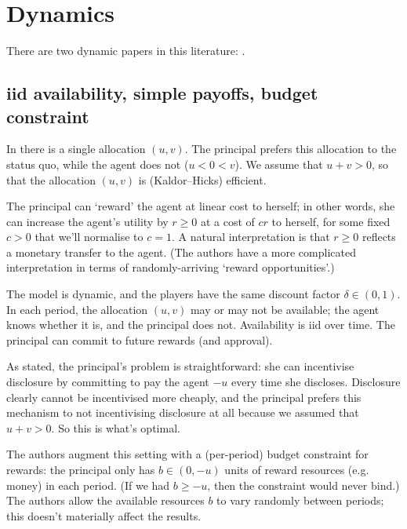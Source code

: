 \section{Dynamics}
\label{sec:ch4:dynamics}

There are two dynamic papers in this literature: \textcite{BirdFrug2019,sfb}.



\subsection{iid availability, simple payoffs, budget constraint}
\label{sec:ch4:dynamics:birdfrug}

In \textcite{BirdFrug2019} there is a single allocation $(u,v)$.
The principal prefers this allocation to the status quo,
while the agent does not ($u<0<v$).
We assume that $u+v>0$, so that the allocation $(u,v)$ is (Kaldor--Hicks) efficient.

The principal can `reward' the agent at linear cost to herself;
in other words, she can increase the agent's utility by $r \geq 0$ at a cost of $c r$ to herself, for some fixed $c>0$ that we'll normalise to $c=1$.
A natural interpretation is that $r \geq 0$ reflects a monetary transfer to the agent. (The authors have a more complicated interpretation in terms of randomly-arriving `reward opportunities'.)

The model is dynamic, and the players have the same discount factor $\delta \in (0,1)$. In each period, the allocation $(u,v)$ may or may not be available; the agent knows whether it is, and the principal does not.
Availability is iid over time.
The principal can commit to future rewards (and approval).

As stated, the principal's problem is straightforward:
she can incentivise disclosure by committing to pay the agent $-u$ every time she discloses. Disclosure clearly cannot be incentivised more cheaply, and the principal prefers this mechanism to not incentivising disclosure at all because we assumed that $u+v>0$. So this is what's optimal.

The authors augment this setting with a (per-period) budget constraint for rewards:
the principal only has $b \in (0,-u)$ units of reward resources (e.g. money) in each period. (If we had $b \geq -u$, then the constraint would never bind.)
The authors allow the available resources $b$ to vary randomly between periods;
this doesn't materially affect the results.

